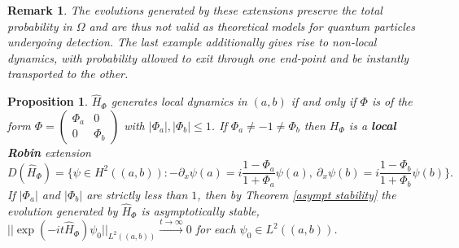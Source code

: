 \documentclass{article}
\numberwithin{equation}{section}
\newtheorem{proposition}{Proposition}[section]
\newtheorem{remark}{Remark}[section]
\begin{document}
    \begin{remark}
     The evolutions generated by these extensions preserve the total probability in $\Omega$ and are thus not valid as theoretical models for quantum particles undergoing detection. The last example additionally gives rise to \textit{non-local} dynamics, with probability allowed to exit through one end-point and be instantly transported to the other.
    \end{remark}
    \begin{proposition}
     $\hat{H}_\Phi$ generates local dynamics in $(a,b)$ if and only if $\Phi$ is of the form $\Phi=\begin{pmatrix}
         \Phi_a & 0
         \\
         0 & \Phi_b
     \end{pmatrix}$ with $|\Phi_a|, |\Phi_b| \leq 1$. If $\Phi_a \neq -1 \neq \Phi_b$ then $H_\Phi$ is a \textbf{local Robin} extension \begin{equation}
        D(\hat{H}_\Phi)=\{ \psi \in H^2((a,b)): -\partial_x \psi (a)=i \frac{1-\Phi_a}{1+\Phi_a} \psi(a),~ \partial_x \psi(b)=i\frac{1-\Phi_b}{1+\Phi_b} \psi(b) \}.
    \end{equation}
    If $|\Phi_a|$ and $|\Phi_b|$ are strictly less than $1$, then by Theorem \ref{asympt stability} the evolution generated by $\hat{H}_\Phi$ is asymptotically stable, $||\exp(-it\hat{H}_\Phi)\psi_0||_{L^2((a,b))}\xrightarrow{t \to \infty}0$ for each $\psi_0\in L^2((a,b))$. 
    \end{proposition}
    
\end{document}

